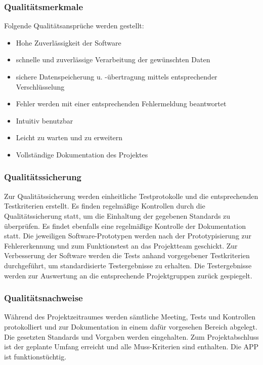 \subsubsection{Qualitätsmerkmale}
Folgende Qualitätsansprüche werden gestellt:
\begin{itemize}
	\item Hohe Zuverlässigkeit der Software
	\item schnelle und zuverlässige Verarbeitung der gewünschten Daten
	\item sichere Datenspeicherung u. -übertragung mittels entsprechender Verschlüsselung
	\item Fehler werden mit einer entsprechenden Fehlermeldung beantwortet
	\item Intuitiv benutzbar
	\item Leicht zu warten und zu erweitern
	\item Vollständige Dokumentation des Projektes
\end{itemize}




\subsubsection{Qualitätssicherung}
Zur Qualitätssicherung werden einheitliche Testprotokolle und die entsprechenden Testkriterien erstellt. Es finden regelmäßige Kontrollen durch die Qualitätssicherung statt, um die Einhaltung der gegebenen Standards zu überprüfen. Es findet ebenfalls eine regelmäßige Kontrolle der Dokumentation statt. Die jeweiligen Software-Prototypen werden nach der Prototypisierung zur Fehlererkennung und zum Funktionstest an das Projektteam geschickt. Zur Verbesserung der Software werden die Tests anhand vorgegebener Testkriterien durchgeführt, um standardisierte Testergebnisse zu erhalten. Die Testergebnisse werden zur Auswertung an die entsprechende Projektgruppen zurück gespiegelt.


\subsubsection{Qualitätsnachweise}
Während des Projektzeitraumes werden sämtliche Meeting, Tests und Kontrollen protokolliert und zur Dokumentation in einem dafür vorgesehen Bereich abgelegt. Die gesetzten Standards und Vorgaben werden eingehalten. Zum Projektabschluss ist der geplante Umfang erreicht und alle Muss-Kriterien sind enthalten. Die APP ist funktionstüchtig.



